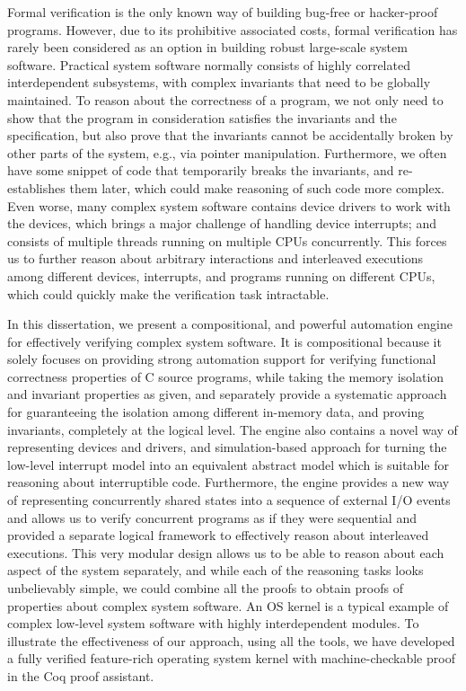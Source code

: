 Formal verification is the only known way of building bug-free or hacker-proof
programs. However, due to its prohibitive associated costs, formal verification
has rarely been considered as an option in building robust large-scale system software.
Practical system software normally consists of highly correlated interdependent subsystems,
with complex invariants that need to be globally maintained. To reason about the correctness of
a program, we not only need to show that the program in consideration
satisfies the invariants and the specification, but also prove that the invariants cannot be
accidentally broken by other parts of the system, e.g., via pointer manipulation.
Furthermore, we often have some snippet of code that temporarily breaks the invariants,
and re-establishes them later, which could make reasoning of such code more complex.
Even worse, many complex system software contains device drivers to work with the devices,
which brings a major challenge of handling device interrupts;
and consists of multiple threads running on multiple CPUs concurrently. 
This forces us to further reason about arbitrary interactions and interleaved executions among
different devices, interrupts, and programs running on different CPUs, which could quickly make the verification
task intractable.

In this dissertation, we present a compositional, and powerful automation engine for effectively
verifying complex system software. It is compositional because it solely focuses on providing strong automation
support for verifying functional correctness properties of C source programs, while taking the
memory isolation and invariant properties as given, and separately provide a systematic approach
for guaranteeing the isolation among different in-memory data, and proving invariants, completely
at the logical level. The engine also contains a novel way of representing devices and drivers, and
simulation-based approach for turning the low-level interrupt model into an equivalent abstract model which is
suitable for reasoning about interruptible code. Furthermore, the engine provides a new way of representing
concurrently shared states into a sequence of external I/O events and allows us to verify 
concurrent programs as if they were sequential and provided a separate logical framework to effectively
reason about interleaved executions. This very modular design allows us to be able to reason about each
aspect of the system separately, and while each of the reasoning tasks looks unbelievably simple, we could combine
all the proofs to obtain proofs of properties about complex system software.
An OS kernel is a typical example of complex low-level system software with highly interdependent modules.
To illustrate the effectiveness of our approach, using all the tools, we have developed a fully verified feature-rich
operating system kernel with machine-checkable proof in the Coq proof assistant.



